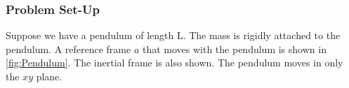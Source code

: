 \subsubsection{Problem Set-Up}
Suppose we have a pendulum of length L. The mass is rigidly attached to the pendulum. A reference frame $a$ that moves with the pendulum is shown in \autoref{fig:Pendulum}. The \gls{inertial frame} is also shown. The pendulum moves in only the $xy$ plane.
\begin{figure}[ht]

\centering


\begin{tikzpicture}[x=0.75pt,y=0.75pt,yscale=-1,xscale=1]


\end{tikzpicture}
\end{figure}
